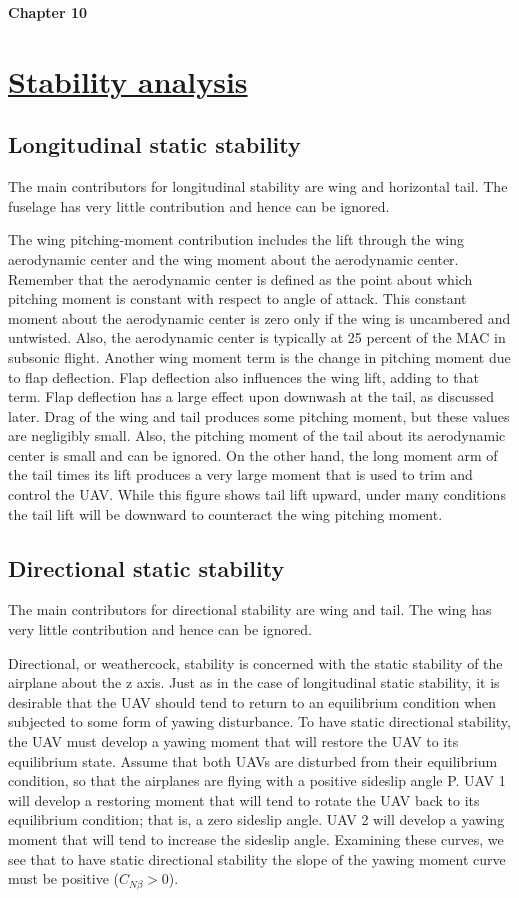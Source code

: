 \documentclass[12 pt]{article}
\begin{document}
{{\newpage
\newpage


\textbf{\Huge{Chapter 10}}
\section{\underline{Stability analysis}}

\subsection{Longitudinal static stability}

The main contributors for longitudinal stability are wing and horizontal tail. The fuselage has very little contribution and hence can be ignored.

The wing pitching-moment contribution includes the lift through the wing 
aerodynamic center and the wing moment about the aerodynamic center. 
Remember that the aerodynamic center is defined as the point about 
which pitching moment is constant with respect to angle of attack. This 
constant moment about the aerodynamic center is zero only if the wing is 
uncambered and untwisted. Also, the aerodynamic center is typically at 
25 percent of the MAC in subsonic flight. Another wing moment term is the change in pitching moment due to flap deflection. Flap deflection also influences the wing lift, adding to that term. Flap deflection has a large effect upon downwash at the tail, as discussed later. Drag of the wing and tail produces some pitching moment, but these values are negligibly small. Also, the pitching moment of the tail about its aerodynamic center is small and can be ignored. On the other hand, the long moment arm of the tail times its lift produces a very large moment that is used to trim and control the UAV. While this figure shows tail lift upward, under many conditions the tail lift will be downward to counteract the wing pitching moment.

\subsection{Directional static stability}

The main contributors for directional stability are wing and tail. The wing has very little contribution and hence can be ignored.

Directional, or weathercock, stability is concerned with the static stability of the 
airplane about the z axis. Just as in the case of longitudinal static stability, it is desirable that the UAV should tend to return to an equilibrium condition when
subjected to some form of yawing disturbance. To have static directional stability, the UAV must develop a yawing moment that will restore the UAV to its equilibrium state. Assume that both UAVs are disturbed from their equilibrium condition, so that the airplanes are flying with a positive sideslip angle P. UAV 1 will develop a restoring moment that will tend to rotate the UAV back to its equilibrium condition; that is, a zero sideslip angle. UAV 2 will develop a yawing moment that will tend to increase the sideslip angle. Examining these curves, we see that to have static directional stability the slope of the yawing moment curve must be positive ($C_{N\beta} > 0$). 

}}
\end{document}
